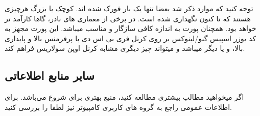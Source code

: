 توجه کنید که موارد ذکر شد بعضا تنها یک بار فورک شده اند. کوچک یا بزرگ هرچیزی هستند که تا کنون نگهداری شده است. در برخی از معماری های نادر،
گاها کارآمد تر خواهد بود. همچنان پورت
به اندازه کافی سازگار و مناسب میباشد. این پورت مجهز به کد یوزر اسپیس گنو/لینوکس بر روی کرنل فری بی اس دی با پرفرمنس بالا و پایداری بالا،
و یا دیگر 
میباشد و میتواند چیز دیگری مشابه کرنل اوپن سولاریس فراهم کند.



\subsection{سایر منابع اطلاعاتی}

اگر میخواهید مطالب بیشتری مطالعه کنید، 
منبع بهتری برای شروع می‌باشد. برای اطلاعات عمومی راجع به گروه های کاربری کامپیوتر نیز لطفا
را بررسی کنید.



